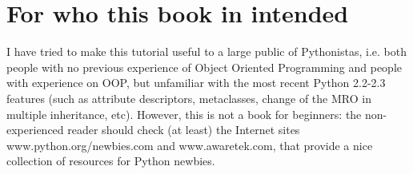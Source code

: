 \documentclass[11pt,english]{book}
\begin{document}

\hypertarget{for-who-this-book-in-intended}{}
\section{For who this book in intended}

I have tried to make this tutorial useful to a large public of Pythonistas, 
i.e. both people with no previous experience of Object Oriented Programming
and people with experience on OOP, but unfamiliar with the most
recent Python 2.2-2.3 features (such as attribute descriptors,
metaclasses, change of the MRO in multiple inheritance, etc). 
However, this is not a book for beginners: the non-experienced reader should 
check (at least) the Internet sites www.python.org/newbies.com and 
www.awaretek.com, that provide a nice collection of resources for Python 
newbies.
\end{document}
